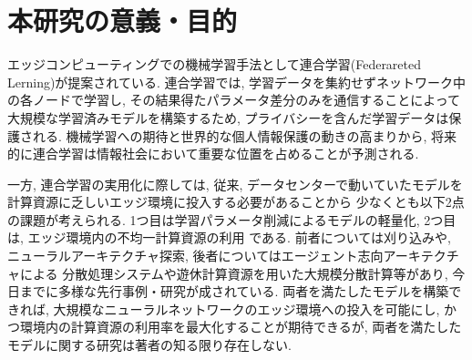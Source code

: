 \documentclass[a4paper,10.5pt,twocolumn]{jsarticle}
\begin{document}


\graphicspath{{./figs/}} %

\section{本研究の意義・目的}

エッジコンピューティングでの機械学習手法として連合学習(Federareted Lerning)が提案されている.
連合学習では, 学習データを集約せずネットワーク中の各ノードで学習し, 
その結果得たパラメータ差分のみを通信することによって
大規模な学習済みモデルを構築するため, プライバシーを含んだ学習データは保護される.
機械学習への期待と世界的な個人情報保護の動きの高まりから, 
将来的に連合学習は情報社会において重要な位置を占めることが予測される.

一方, 連合学習の実用化に際しては, 
従来, データセンターで動いていたモデルを計算資源に乏しいエッジ環境に投入する必要があることから
少なくとも以下2点の課題が考えられる.
1つ目は学習パラメータ削減によるモデルの軽量化, 
2つ目は, エッジ環境内の不均一計算資源の利用
である.
前者については刈り込みや, ニューラルアーキテクチャ探索, 後者についてはエージェント志向アーキテクチャによる
分散処理システムや遊休計算資源を用いた大規模分散計算等があり, 
今日までに多様な先行事例・研究が成されている. 
両者を満たしたモデルを構築できれば, 
大規模なニューラルネットワークのエッジ環境への投入を可能にし, 
かつ環境内の計算資源の利用率を最大化することが期待できるが,  
両者を満たしたモデルに関する研究は著者の知る限り存在しない.
\end{document}

